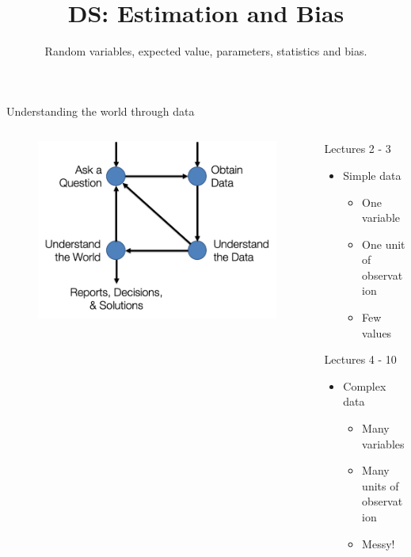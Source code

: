 \documentclass[aspectratio=169]{../latex_main/tntbeamer}  %
\title[Introduction]{DS: Estimation and Bias}
\subtitle{Random variables, expected value, parameters, statistics and bias.}
\begin{document}
	
	\maketitle
    \begin{frame}{Understanding the world through data}
        \begin{columns}
        \begin{column}{.4\textwidth}
            \begin{figure}
                \centering
                \includegraphics[scale=.6]{Bild1}
            \end{figure}
        
        \end{column}
        
        \begin{column}{.4\textwidth}
            Lectures 2 - 3
            \begin{itemize}
                \item Simple data
                \begin{itemize}
                    \item One variable
                    \item One unit of observation
                    \item Few values
                \end{itemize}
            \end{itemize}
        
            Lectures 4 - 10
            \begin{itemize}
                \item Complex data
                \begin{itemize}
                    \item Many variables
                    \item Many units of observation
                    \item Messy!
                \end{itemize}
            \end{itemize}
        

\end{column}
\end{columns}
\end{frame}
\end{document}
